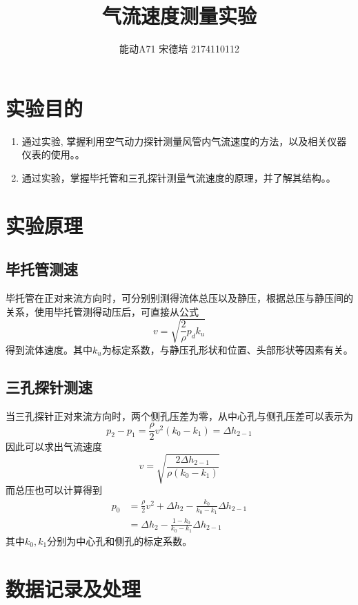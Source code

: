 \documentclass[UTF8]{article}
\title{气流速度测量实验}
\author{能动A71 宋德培 2174110112}
\begin{document}
	\maketitle
	\section{实验目的}
	\begin{enumerate}
	\item	通过实验, 掌握利用空气动力探针测量风管内气流速度的方法，以及相关仪器仪表的使用。。
	\item 	通过实验，掌握毕托管和三孔探针测量气流速度的原理，并了解其结构。。
	\end{enumerate}
	
	\section{实验原理}
	\subsection{毕托管测速}
	毕托管在正对来流方向时，可分别别测得流体总压以及静压，根据总压与静压间的关系，使用毕托管测得动压后，可直接从公式
	\[
	v=\sqrt{\frac{2}{\rho}p_dk_u}
	\]
	得到流体速度。其中$k_u$为标定系数，与静压孔形状和位置、头部形状等因素有关。
	\subsection{三孔探针测速}
	当三孔探针正对来流方向时，两个侧孔压差为零，从中心孔与侧孔压差可以表示为
	\[
	p_2-p_1=\frac{\rho}{2}v^2(k_0-k_1)=\Delta h_{2-1}
	\]
	因此可以求出气流速度
	\[
	v=\sqrt{\frac{2\Delta h_{2-1}}{\rho(k_0-k_1)}}
	\]
	而总压也可以计算得到
	\[
	\begin{split}
	p_0&=\frac{\rho}{2}v^2+\Delta h_2-\frac{k_0}{k_0-k_1}\Delta h_{2-1}\\
	&= \Delta h_2-\frac{1-k_0}{k_0-k_1}\Delta h_{2-1}
	\end{split}
	\]
	其中$k_0,k_1$分别为中心孔和侧孔的标定系数。
	\section{数据记录及处理}
\end{document}
